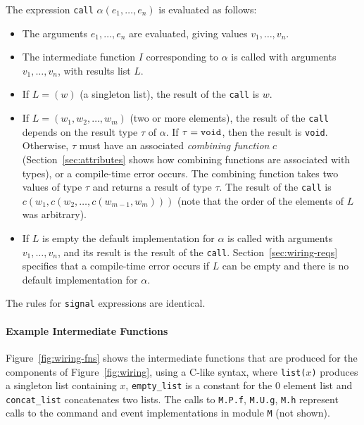 \documentclass[11pt,letterpaper]{article}
\newcommand{\kw}[1]{{\tt #1}}
\newcommand{\code}[1]{{\tt #1}}
\begin{document}
The expression \code{call} $\alpha(e_1, \ldots, e_n)$ is evaluated as
follows:
\begin{itemize}
\item The arguments $e_1, \ldots, e_n$ are evaluated, giving values $v_1,
\ldots, v_n$.

\item The intermediate function $I$ corresponding to $\alpha$ is called
with arguments $v_1, \ldots, v_n$, with results list $L$.

\item If $L = (w)$ (a singleton list), the result of the \code{call}
is $w$.

\item If $L = (w_1, w_2, \ldots, w_m)$ (two or more elements), the result
of the \code{call} depends on the result type $\tau$ of $\alpha$. If $\tau
= \kw{void}$, then the result is \kw{void}. Otherwise, $\tau$ must have an
associated \emph{combining function} $c$ (Section~\ref{sec:attributes}
shows how combining functions are associated with types), or a compile-time
error occurs. The combining function takes two values of type $\tau$ and
returns a result of type $\tau$. The result of the \kw{call} is $c(w_1,
c(w_2, \ldots, c(w_{m-1}, w_m)))$ (note that the order of the elements of 
$L$ was arbitrary).

\item If $L$ is empty the default implementation for $\alpha$ is
called with arguments $v_1, \ldots, v_n$, and its result is the result of
the \code{call}. Section~\ref{sec:wiring-reqs} specifies that a
compile-time error occurs if $L$ can be empty and there is no default
implementation for $\alpha$.
\end{itemize}
The rules for \code{signal} expressions are identical.

\paragraph{Example Intermediate Functions} 

Figure~\ref{fig:wiring-fns} shows the intermediate functions that are
produced for the components of Figure~\ref{fig:wiring}, using a C-like
syntax, where \code{list($x$)} produces a singleton list containing $x$,
\code{empty\_list} is a constant for the 0 element list and
\code{concat\_list} concatenates two lists. The calls to \code{M.P.f},
\code{M.U.g}, \code{M.h} represent calls to the command and event
implementations in module \code{M} (not shown).
\end{document}
